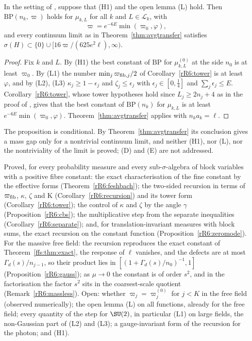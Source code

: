 \begin{proposition}\label{rR6:conditional}
In the setting of \cite[Corollary~102]{BBLR26}, suppose that
\textup{(H1)} and the open lemma \textup{(L)} hold. Then $\mathrm{BP}(n_k,
\varpi)$ holds for $\mu_{k,L}$ for all $k$ and $L\in\mathcal L_k$, with
\[
\varpi=e^{-6E}\min(\varpi_0,\varphi),
\]
and every continuum limit as in Theorem~\textup{\ref{thm:avgtransfer}}
satisfies $\sigma(H)\subset\{0\}\cup[16\varpi/(625e^2\ell),\infty)$.
\end{proposition}

\begin{proof}
Fix $k$ and $L$. By (H1) the best constant of $\mathrm{BP}$ for
$\mu^{(0)}_{k,L}$ at the side $n_0$ is at least $\varpi_0$. By (L1) the
number $\min_j\varpi_{{\rm fib},j}/2$ of Corollary~\ref{rR6:tower} is at
least $\varphi$, and by (L2), (L3) $\kappa_j\ge1-\epsilon_j$ and $\zeta_j\le
\epsilon_j$ with $\epsilon_j\in[0,\frac14]$ and $\sum_j\epsilon_j\le E$.
Corollary~\ref{rR6:tower}, whose tower hypotheses hold since $L_j\ge2n_j+4$
as in the proof of \cite[Corollary~102]{BBLR26}, gives that the best
constant of $\mathrm{BP}(n_k)$ for $\mu_{k,L}$ is at least $e^{-6E}\min(
\varpi_0,\varphi)$. Theorem~\ref{thm:avgtransfer} applies with $n_ka_k=
\ell$.
\end{proof}

The proposition is conditional. By Theorem~\ref{thm:avgtransfer} its
conclusion gives a mass gap only for a nontrivial continuum limit, and
neither (H1), nor (L), nor the nontriviality of the limit is proved;
(D) and (E) are not addressed.

\begin{remark}\label{rR6:status}
Proved, for every probability measure and every sub-$\sigma$-algebra of
block variables with a positive fibre constant: the exact characterisation of the fine constant by the
effective forms (Theorem~\ref{rR6:feshbach}); the two-sided recursion in
terms of $\varpi_{\rm fib}$, $\kappa$, $\zeta$ and $\mathrm K$
(Corollary~\ref{rR6:recursion}) and its tower form
(Corollary~\ref{rR6:tower}); the control of $\kappa$ and $\zeta$ by the
angle $\gamma$ (Proposition~\ref{rR6:cbs}); the multiplicative step from
the separate inequalities (Corollary~\ref{rR6:separate}); and, for
translation-invariant measures with block sums, the exact recursion on the
constant function (Proposition~\ref{rR6:zeromode}). For the massive free
field: the recursion reproduces the exact constant of
Theorem~\ref{ffs:thm:exact}, the response of $\ell$ vanishes, and the
defects are at most $\Gamma_d(s)/n_{j-1}$, so their product lies in
$[(1+\Gamma_d(s)/n_0)^{-1},1]$ (Proposition~\ref{rR6:gauss}); as $\mu\to0$
the constant is of order $s^2$, and in the factorisation the factor $s^2$
sits in the coarsest-scale quotient (Remark~\ref{rR6:massless}). Open: whether $\varpi_j=\varpi^{(0)}_j$ for
$j<K$ in the free field (observed numerically); the open lemma (L) on all
functions, already for the free field; every quantity of the step for
$\SU(2)$, in particular (L1) on large fields, the non-Gaussian part of
(L2) and (L3); a gauge-invariant form of the recursion for the photon; and
(H1).
\end{remark}
